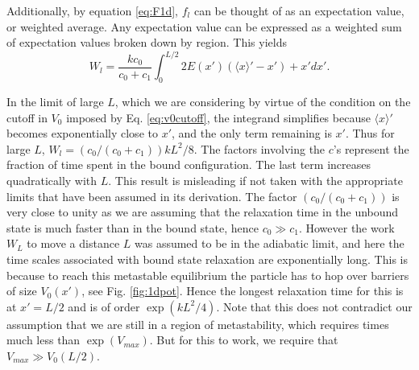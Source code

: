 \documentclass[11pt]{ucthesis}
\begin{document}
Additionally, by equation \ref{eq:F1d}, $f_l$ can be thought of as an expectation value, or weighted average. Any expectation value can be expressed as a weighted sum of expectation values broken down by region.
%
This yields
\begin{equation}
W_l = \frac{k c_0}{c_0+c_1} \int_0^{L/2} 2 E(x')(\langle x\rangle' - x') + x' dx' .
\end{equation}


In the limit of large $L$, which we are considering by virtue of the condition
on the cutoff in $V_0$ imposed by Eq. \ref{eq:v0cutoff}, the integrand
simplifies because $\langle x\rangle'$ becomes exponentially close to $x'$, and
the only term remaining is $x'$. Thus for large $L$, $W_l = (c_0/(c_0+c_1))k L^2/8$.
The factors involving the $c$'s represent the fraction of time spent in the
bound configuration. The last term increases quadratically with $L$. This result
is misleading if not taken with the appropriate limits that have been assumed in
its derivation. The factor $(c_0/(c_0+c_1))$ is very close to unity as we are
assuming that the relaxation time in the unbound state is much faster than in
the bound state, hence $c_0 \gg c_1$. However the work $W_L$ to move a distance
$L$ was assumed to be in the adiabatic limit, and here the time scales
associated with bound state relaxation are exponentially long. This is because
to reach this metastable equilibrium the particle has to hop over barriers of
size $V_0(x')$, see Fig. \ref{fig:1dpot}. Hence the  longest relaxation time for this is
at $x'=L/2$ and is of order $\exp(kL^2/4)$. Note that this does not contradict
our assumption that we are still in a region of metastability, which requires
times much less than $\exp(V_{max})$. But for this to work, we require that $V_{max} \gg V_0(L/2)$.
\end{document}
